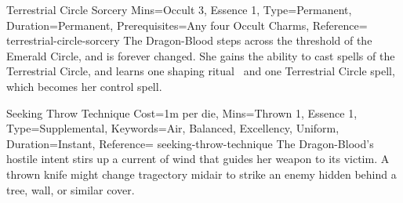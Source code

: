 
\begin{Charm}{Terrestrial Circle Sorcery}{%
    Mins={Occult 3, Essence 1},
    Type=Permanent,
    Duration=Permanent,
    Prerequisites=Any four Occult Charms,
    Reference=\cite*[p.~235]{db}
}{terrestrial-circle-sorcery}
    The Dragon-Blood steps across the threshold of the Emerald Circle, and is
    forever changed. She gains the ability to cast spells of the Terrestrial
    Circle, and learns one shaping ritual~\parencite*[p.~466]{ex3} and one
    Terrestrial Circle spell, which becomes her control spell.
\end{Charm}




\begin{Charm}{Seeking Throw Technique}{%
    Cost=1m per die,
    Mins={Thrown 1, Essence 1},
    Type=Supplemental,
    Keywords={Air, Balanced, Excellency, Uniform},
    Duration=Instant,
    Reference=\cite*[p.~275]{db}
}{seeking-throw-technique}
    The Dragon-Blood's hostile intent stirs up a current of wind that guides
    her weapon to its victim. A thrown knife might change tragectory midair to
    strike an enemy hidden behind a tree, wall, or similar cover. 

\end{Charm}


\printbibliography[title=References]

